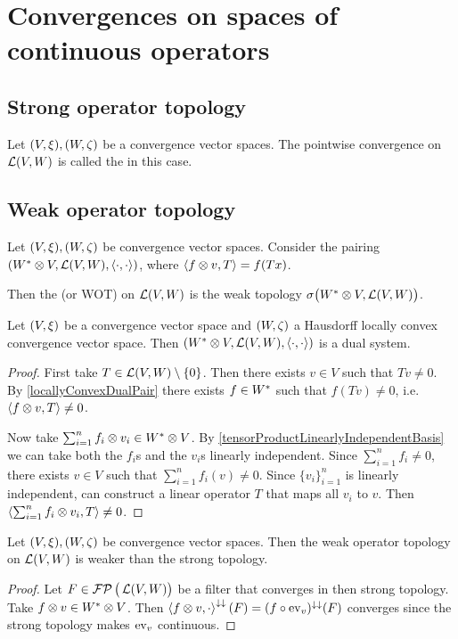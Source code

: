 \section{Convergences on spaces of continuous operators}
\subsection{Strong operator topology}
\begin{definition}
Let $\sSet{V,\xi}, \sSet{W,\zeta}$ be a convergence vector spaces. The pointwise convergence on $\operatorname{\mathcal{L}}(V,W)$ is called the  in this case.
\end{definition}

\subsection{Weak operator topology}
\begin{definition}
Let $\sSet{V, \xi}, \sSet{W,\zeta}$ be convergence vector spaces. Consider the pairing $\sSet{\dual{W}\otimes V, \contLin(V,W), \pair{\cdot, \cdot}}$, where $\left\langle f\otimes v, T \right\rangle = f(Tx)$.

Then the  (or WOT) on $\operatorname{\mathcal{L}}(V,W)$ is the weak topology $\sigma\big({W}^*\otimes V, \operatorname{\mathcal{L}}(V,W)\big)$.
\end{definition}
\begin{lemma}
Let $\sSet{V, \xi}$ be a convergence vector space and $\sSet{W,\zeta}$ a Hausdorff locally convex convergence vector space. Then $\sSet{\dual{W}\otimes V, \contLin(V,W), \pair{\cdot, \cdot}}$ is a dual system. 
\end{lemma}
\begin{proof}
First take $T\in \operatorname{\mathcal{L}}(V,W)\setminus \{0\}$. Then there exists $v\in V$ such that $Tv \neq 0$. By \ref{locallyConvexDualPair} there exists $f\in {W}^*$ such that $f(Tv) \neq 0$, i.e. $\left\langle f\otimes v, T \right\rangle \neq 0$.

Now take $\sum_{i=1}^nf_i\otimes v_i \in {W}^*\otimes V$. By \ref{tensorProductLinearlyIndependentBasis} we can take both the $f_i$s and the $v_i$s linearly independent. Since $\sum_{i=1}^n f_i \neq 0$, there exists $v\in V$ such that $\sum_{i=1}^n f_i(v) \neq 0$. Since $\{v_i\}_{i=1}^n$ is linearly independent, can construct a linear operator $T$ that maps all $v_i$ to $v$. Then $\left\langle \sum_{i=1}^nf_i\otimes v_i, T \right\rangle \neq 0$.
\end{proof}

\begin{lemma}
Let $\sSet{V, \xi}, \sSet{W,\zeta}$ be convergence vector spaces. Then the weak operator topology on $\operatorname{\mathcal{L}}(V,W)$ is weaker than the strong topology.
\end{lemma}
\begin{proof}
Let $F\in\operatorname{\mathcal{FP}}\big(\operatorname{\mathcal{L}}(V,W)\big)$ be a filter that converges in then strong topology. Take $f\otimes v\in {W}^*\otimes V$. Then $\left\langle f\otimes v,\cdot \right\rangle^{\downarrow\downarrow}(F) = (f\circ \operatorname{ev}_v)^{\downarrow\downarrow}(F)$ converges since the strong topology makes $\operatorname{ev}_v$ continuous.
\end{proof}

